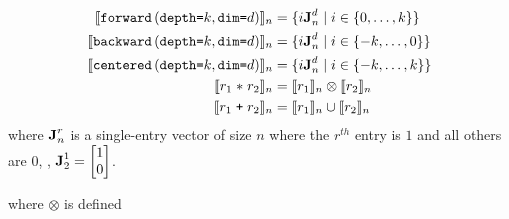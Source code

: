 \begin{align*}
%
%
\interp{\stenFwd{k}{d}}_n & =
 \{i\singleEntry{d}{n} \mid i \in \{0, \ldots, k\} \} \\
\interp{\stenBwd{k}{d}}_n & =
 \{i\singleEntry{d}{n} \mid i \in \{-k, \ldots, 0\} \} \\
\interp{\stenCen{k}{d}}_n & =
 \{i\singleEntry{d}{n} \mid i \in \{-k, \ldots, k\} \} \\
%
%
\interp{r_1 \; \texttt{$\ast$} \; r_2}_n &
= \interp{r_1}_n \otimes \interp{r_2}_n \\
%
%
\interp{r_1 \; \texttt{+} \; r_2}_n &
= \interp{r_1}_n \cup \interp{r_2}_n
\end{align*}
where $\singleEntry{r}{n}$ is a single-entry vector of size $n$
where the $r^{th}$ entry is $1$ and all others are $0$, \eg{},
$\singleEntry{1}{2} = \vtwo{1}{0}$.

where $\otimes$ is defined 